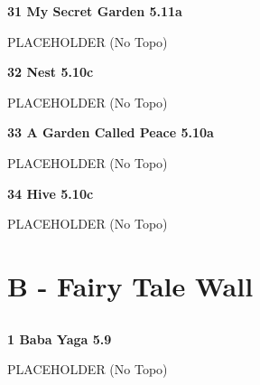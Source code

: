 \begin{multicols}{2}
\needspace{1.5cm}
\label{rt:My Secret Garden}
\colorbox{RoyalBlue!20}{
\parbox{0.95\linewidth}{
\textbf{
31 My Secret Garden 5.11a  
}}}

\begin{adjustwidth}{0.5cm}{}			
PLACEHOLDER (No Topo)
\end{adjustwidth}



\needspace{1.5cm}
\label{rt:Nest}
\colorbox{RoyalBlue!20}{
\parbox{0.95\linewidth}{
\textbf{
32 Nest 5.10c  
}}}

\begin{adjustwidth}{0.5cm}{}			
PLACEHOLDER (No Topo)
\end{adjustwidth}



\needspace{1.5cm}
\label{rt:A Garden Called Peace}
\colorbox{RoyalBlue!20}{
\parbox{0.95\linewidth}{
\textbf{
33 A Garden Called Peace 5.10a  
}}}

\begin{adjustwidth}{0.5cm}{}			
PLACEHOLDER (No Topo)
\end{adjustwidth}



\needspace{1.5cm}
\label{rt:Hive}
\colorbox{RoyalBlue!20}{
\parbox{0.95\linewidth}{
\textbf{
34 Hive 5.10c  
}}}

\begin{adjustwidth}{0.5cm}{}			
PLACEHOLDER (No Topo)
\end{adjustwidth}




\newpage

\section{B - Fairy Tale Wall}\label{sa:Fairy Tale Wall}




\needspace{1.5cm}
\subsection*{}\label{bf:}
	


\needspace{1.5cm}
\label{rt:Baba Yaga}
\colorbox{green!20}{
\parbox{0.95\linewidth}{
\textbf{
1 Baba Yaga 5.9  
}}}

\begin{adjustwidth}{0.5cm}{}			
PLACEHOLDER (No Topo)
\end{adjustwidth}




\end{multicols}
